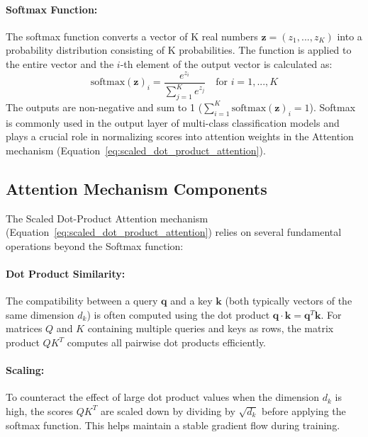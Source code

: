 \paragraph{Softmax Function:}
The softmax function converts a vector of K real numbers \( \bm{z} = (z_1, ..., z_K) \) into a probability distribution consisting of K probabilities. The function is applied to the entire vector and the \( i \)-th element of the output vector is calculated as:
\begin{equation}
  \text{softmax}(\bm{z})_i = \frac{e^{z_i}}{\sum_{j=1}^K e^{z_j}} \quad \text{for } i = 1, ..., K
\end{equation}
The outputs are non-negative and sum to 1 (\( \sum_{i=1}^K \text{softmax}(\bm{z})_i = 1 \)). Softmax is commonly used in the output layer of multi-class classification models and plays a crucial role in normalizing scores into attention weights in the Attention mechanism (Equation~\ref{eq:scaled_dot_product_attention}).

\subsection{Attention Mechanism Components}
The Scaled Dot-Product Attention mechanism (Equation~\ref{eq:scaled_dot_product_attention}) relies on several fundamental operations beyond the Softmax function:

\paragraph{Dot Product Similarity:}
The compatibility between a query \( \bm{q} \) and a key \( \bm{k} \) (both typically vectors of the same dimension \( d_k \)) is often computed using the dot product \( \bm{q} \cdot \bm{k} = \bm{q}^T \bm{k} \). For matrices \( Q \) and \( K \) containing multiple queries and keys as rows, the matrix product \( QK^T \) computes all pairwise dot products efficiently.

\paragraph{Scaling:}
To counteract the effect of large dot product values when the dimension \( d_k \) is high, the scores \( QK^T \) are scaled down by dividing by \( \sqrt{d_k} \) before applying the softmax function. This helps maintain a stable gradient flow during training.

